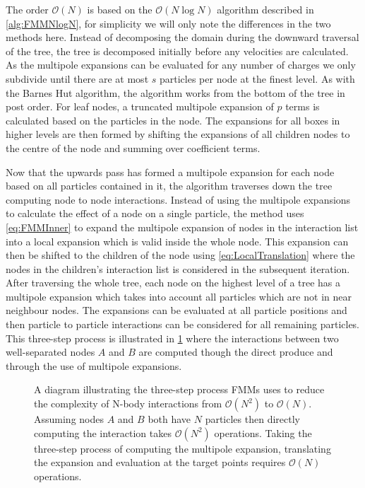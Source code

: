The order $\mathcal{O}(N)$ is based on the $\mathcal{O}(N\log N)$ algorithm described in \cref{alg:FMMNlogN}, for simplicity we will only note the differences in the two methods here. Instead of decomposing the domain during the downward traversal of the tree, the tree is decomposed initially before any velocities are calculated. As the multipole expansions can be evaluated for any number of charges we only subdivide until there are at most $s$ particles per node at the finest level. As with the Barnes Hut algorithm, the algorithm works from the bottom of the tree in post order. For leaf nodes, a truncated multipole expansion of $p$ terms is calculated based on the particles in the node. The expansions for all boxes in higher levels are then formed by shifting the expansions of all children nodes to the centre of the node and summing over coefficient terms.

Now that the upwards pass has formed a multipole expansion for each node based on all particles contained in it, the algorithm traverses down the tree computing node to node interactions. Instead of using the multipole expansions to calculate the effect of a node on a single particle, the method uses \cref{eq:FMMInner} to expand the multipole expansion of nodes in the interaction list into a local expansion which is valid inside the whole node. This expansion can then be shifted to the children of the node using \cref{eq:LocalTranslation} where the nodes in the children's interaction list is considered in the subsequent iteration.  After traversing the whole tree, each node on the highest level of a tree has a multipole expansion which takes into account all particles which are not in near neighbour nodes. The expansions can  be evaluated at all particle positions and then particle to particle interactions can be considered for all remaining particles. This three-step process is illustrated in \cref{fig:3Step} where the interactions between two well-separated nodes $A$ and $B$ are computed though the direct produce and through the use of multipole expansions.

\begin{figure}
    \centering
        \resizebox{.6\linewidth}{!}{}
    \caption[A diagram illustrating the three-step process FMM uses to reduce the complexity of N-body interactions from $\mathcal{O}(N^2)$ to $\mathcal{O}(N)$.]{A diagram illustrating the three-step process FMMs uses to reduce the complexity of N-body interactions from $\mathcal{O}(N^2)$ to $\mathcal{O}(N)$. Assuming nodes $A$ and $B$ both have $N$ particles then directly computing the interaction takes $\mathcal{O}(N^2)$ operations. Taking the three-step process of computing the multipole expansion, translating the expansion and evaluation at the target points requires $\mathcal{O}(N)$ operations.
    }
    \label{fig:3Step}
\end{figure}

